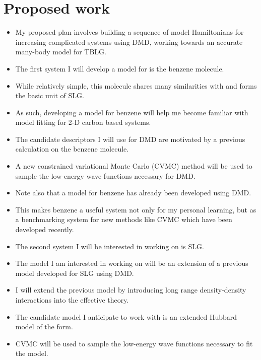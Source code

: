 \documentclass{article}
\begin{document}
\section{Proposed work}
\begin{itemize}
\item My proposed plan involves building a sequence of model Hamiltonians for increasing complicated systems using DMD, working towards an accurate many-body model for TBLG.

\item The first system I will develop a model for is the benzene molecule.

\item While relatively simple, this molecule shares many similarities with and forms the basic unit of SLG.

\item As such, developing a model for benzene will help me become familiar with model fitting for 2-D carbon based systems.

\item The candidate descriptors I will use for DMD are motivated by a previous calculation on the benzene molecule.

\item A new constrained variational Monte Carlo (CVMC) method will be used to sample the low-energy wave functions necessary for DMD.

\item Note also that a model for benzene has already been developed using DMD.

\item This makes benzene a useful system not only for my personal learning, but as a benchmarking system for new methods like CVMC which have been developed recently.

\item The second system I will be interested in working on is SLG.

\item The model I am interested in working on will be an extension of a previous model developed for SLG using DMD.

\item I will extend the previous model by introducing long range density-density interactions into the effective theory.

\item The candidate model I anticipate to work with is an extended Hubbard model of the form.

\item CVMC will be used to sample the low-energy wave functions necessary to fit the model.


\end{itemize}
\end{document}
